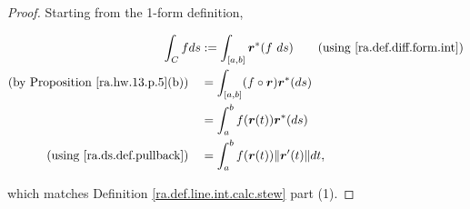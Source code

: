 \begin{proof}

Starting from the 1-form definition,

\begin{align*}
\int_C f ds & := \int_{[a,b]} \boldsymbol{r}^*(f \ ds) \qquad \text{(using \eqref{ra.def.diff.form.int})} 
\\   \text{(by Proposition \ref{ra.hw.13.p.5}(b))} \quad & = \int_{[a,b]} (f \circ \boldsymbol{r})\boldsymbol{r}^*(ds) 
\\  & = \int_a^b f(\boldsymbol{r}(t))   \boldsymbol{r}^*(ds)
\\  \text{(using \eqref{ra.ds.def.pullback})} \quad  & = \int_a^b f(\boldsymbol{r}(t))   \lVert \boldsymbol{r}'(t) \rVert dt,
\end{align*}

which matches Definition \ref{ra.def.line.int.calc.stew} part (1).

\end{proof}

